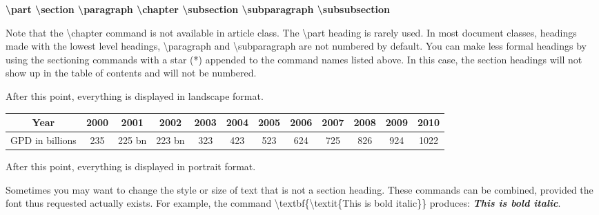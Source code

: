 \documentclass[12pt,openright]{book}
\begin{document}
\textbf{\textbackslash part \textbackslash section \textbackslash paragraph
\textbackslash chapter \textbackslash subsection \textbackslash subparagraph
\textbackslash subsubsection}

Note that the \textbackslash chapter command is not available in article class. The \textbackslash part heading is rarely used. In most document classes, headings made with the lowest level headings, \textbackslash paragraph and \textbackslash subparagraph are not numbered by default. You can make less formal headings by using the sectioning commands with a star (*) appended to the  command names listed above. In this case, the section headings will
not show up in the table of contents and will not be numbered.

\begin{landscape}
  After this point, everything is displayed in landscape format.
  
  \begin{tabular}{|c|c|c|c|c|c|c|c|c|c|c|c|}
    \hline
    Year & 2000 & 2001 & 2002 & 2003 & 2004 & 2005 & 2006 & 2007 & 2008 & 2009 & 2010 \\
    \hline 
    GPD in billions & 235  &  225 bn & 223 bn & 323 & 423  & 523 & 624 & 725 & 826  & 924  & 1022  \\
    \hline 
  \end{tabular}
\end{landscape}

After this point, everything is displayed in portrait format.

Sometimes you may want to change the style or size of text that is not a section heading. These commands can be combined, provided the font thus requested actually exists. For example, the command \textbackslash textbf\{\textbackslash textit\{This is bold italic\}\} produces: \textbf{\textit{This is bold italic}}.
\end{document}
